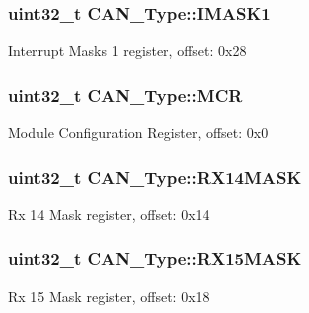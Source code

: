 \subsubsection[{\texorpdfstring{I\+M\+A\+S\+K1}{IMASK1}}]{ uint32\+\_\+t C\+A\+N\+\_\+\+Type\+::\+I\+M\+A\+S\+K1}\hypertarget{structCAN__Type_ab0b36ce2b449df3402efa1e351b1f71e}{}\label{structCAN__Type_ab0b36ce2b449df3402efa1e351b1f71e}
Interrupt Masks 1 register, offset\+: 0x28 
\subsubsection[{\texorpdfstring{M\+CR}{MCR}}]{ uint32\+\_\+t C\+A\+N\+\_\+\+Type\+::\+M\+CR}\hypertarget{structCAN__Type_ad73bb76d98c915b02cad2772fa4f2411}{}\label{structCAN__Type_ad73bb76d98c915b02cad2772fa4f2411}
Module Configuration Register, offset\+: 0x0 
\subsubsection[{\texorpdfstring{R\+X14\+M\+A\+SK}{RX14MASK}}]{ uint32\+\_\+t C\+A\+N\+\_\+\+Type\+::\+R\+X14\+M\+A\+SK}\hypertarget{structCAN__Type_a3d48b30abe2b822887ce75dc3668ff6f}{}\label{structCAN__Type_a3d48b30abe2b822887ce75dc3668ff6f}
Rx 14 Mask register, offset\+: 0x14 
\subsubsection[{\texorpdfstring{R\+X15\+M\+A\+SK}{RX15MASK}}]{ uint32\+\_\+t C\+A\+N\+\_\+\+Type\+::\+R\+X15\+M\+A\+SK}\hypertarget{structCAN__Type_a0dbf70b6381b014cd0ee53d573ba13c7}{}\label{structCAN__Type_a0dbf70b6381b014cd0ee53d573ba13c7}
Rx 15 Mask register, offset\+: 0x18 
